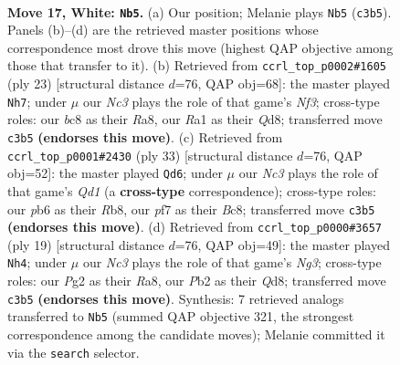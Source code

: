 \documentclass[11pt]{article}
\begin{document}
\begin{figure}[p]
\label{fig:thought-m30}
\end{figure}

\clearpage

\begin{figure}[p]\centering
\begin{subfigure}{0.46\textwidth}\centering
\resizebox{\linewidth}{!}{%
\newchessgame
\chessboard[
  setfen={1nb1qrk1/r1p1nppp/1p2p3/3pP3/p2P1P2/2N5/PPP2KPP/R2Q1BNR w - - 0 17},
  showmover=false,
  pgfstyle=straightmove, color=movearrow, markmove={c3-b5}
]}
\caption{}
\end{subfigure}\hfill
\begin{subfigure}{0.46\textwidth}\centering
\resizebox{\linewidth}{!}{%
\newchessgame
\chessboard[
  setfen={r1bq1rk1/pp2npp1/3p1n1p/2pPp3/2P1P3/2PB4/P2N1PPP/R1BQR1K1 b - - 0 12},
  showmover=false,
  pgfstyle=straightmove, color=movearrow, markmove={f6-h7}
]}
\caption{}
\end{subfigure}
\\[4pt]
\begin{subfigure}{0.46\textwidth}\centering
\resizebox{\linewidth}{!}{%
\newchessgame
\chessboard[
  setfen={1rbqr1k1/2n1pp1p/pp4p1/2pPp3/P1B1P3/2N4P/1PP1QPP1/RR4K1 b - - 1 17},
  showmover=false,
  pgfstyle=straightmove, color=movearrow, markmove={d8-d6}
]}
\caption{}
\end{subfigure}\hfill
\begin{subfigure}{0.46\textwidth}\centering
\resizebox{\linewidth}{!}{%
\newchessgame
\chessboard[
  setfen={r2qkb1r/pp1n1pp1/2p1p1n1/3pP2p/3P4/3N4/PPPN1PPP/R1BQ1RK1 b kq - 0 10},
  showmover=false,
  pgfstyle=straightmove, color=movearrow, markmove={g6-h4}
]}
\caption{}
\end{subfigure}
\caption{\textbf{Move 17, White: \texttt{Nb5}.} (a) Our position; Melanie plays \texttt{Nb5} (\texttt{c3b5}). Panels (b)--(d) are the retrieved master positions whose correspondence most drove this move (highest QAP objective among those that transfer to it). (b) Retrieved from \texttt{ccrl\_top\_p0002\#1605} (ply 23) [structural distance $d$=76, QAP obj=68]: the master played \texttt{Nh7}; under $\mu$ our \emph{Nc3} plays the role of that game's \emph{Nf3}; cross-type roles: our \emph{b}c8 as their \emph{R}a8, our \emph{R}a1 as their \emph{Q}d8; transferred move \texttt{c3b5} \textbf{(endorses this move)}. (c) Retrieved from \texttt{ccrl\_top\_p0001\#2430} (ply 33) [structural distance $d$=76, QAP obj=52]: the master played \texttt{Qd6}; under $\mu$ our \emph{Nc3} plays the role of that game's \emph{Qd1} (a \textbf{cross-type} correspondence); cross-type roles: our \emph{p}b6 as their \emph{R}b8, our \emph{p}f7 as their \emph{B}c8; transferred move \texttt{c3b5} \textbf{(endorses this move)}. (d) Retrieved from \texttt{ccrl\_top\_p0000\#3657} (ply 19) [structural distance $d$=76, QAP obj=49]: the master played \texttt{Nh4}; under $\mu$ our \emph{Nc3} plays the role of that game's \emph{Ng3}; cross-type roles: our \emph{P}g2 as their \emph{R}a8, our \emph{P}b2 as their \emph{Q}d8; transferred move \texttt{c3b5} \textbf{(endorses this move)}. Synthesis: 7 retrieved analogs transferred to \texttt{Nb5} (summed QAP objective 321, the strongest correspondence among the candidate moves); Melanie committed it via the \texttt{search} selector.}

\end{figure}
\end{document}

